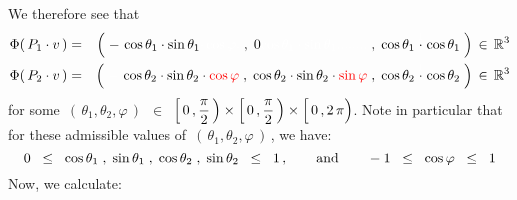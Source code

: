 We therefore see that
\begin{eqnarray*}
\Phi(\,P_{1}\cdot v\,)
& = &
	\left(\;
		-\,\cos\theta_{1}\cdot\sin\theta_{1}{\color{white}\cdot\cos\varphi.}
		\; , \;
		0{\color{white}\cos\theta_{1}\cdot\sin\theta_{1}........}
		\; , \;
		\cos\theta_{1}\overset{{\color{white}1}}{\cdot}\cos\theta_{1}
		\;\right)
	\,\in\, \Re^{3}
\\
\Phi(\,P_{2}\cdot v\,)
& = &
	\left(\;
		{\color{white}-}\,\cos\theta_{2}\cdot\sin\theta_{2}\cdot{\color{red}\cos\varphi}
		\; , \;
		\cos\theta_{2}\cdot\sin\theta_{2}\cdot{\color{red}\sin\varphi}
		\; , \;
		\cos\theta_{2}\overset{{\color{white}1}}{\cdot}\cos\theta_{2}
		\;\right)
	\,\in\, \Re^{3}
\end{eqnarray*}
for some \,$(\,\theta_{1}, \theta_{2},\varphi\,)$ \,$\in$\,
$\left[\,0\,,\dfrac{\pi}{2}\,\right) \times \left[\,0\,,\dfrac{\pi}{2}\,\right) \times \left[\,0\,,\overset{{\color{white}.}}{2\,\pi}\right)$.
Note in particular that for these admissible values of \,$(\,\theta_{1}, \theta_{2},\varphi\,)$\,, we have:
\begin{equation}\label{sineCosineRestrictions}
0
\;\; \leq \;\;
	\cos\theta_{1} \; , \; \sin\theta_{1} \; , \; \cos\theta_{2} \; , \; \sin\theta_{2}
\;\; \leq \;\;
	1\,,
\quad\quad\textnormal{and}\quad\quad
-1
\;\; \leq \;\;
	\cos\varphi
\;\; \leq \;\;
	1
\end{equation}
Now, we calculate:
